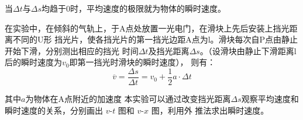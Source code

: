 \documentclass[UTF8]{article}
\theoremstyle{MyLineTheoremStyle} %
\theoremstyle{MyBlockTheoremStyle} %
\theoremstyle{MySubsubsectionStyle} %
\begin{document}
当$\Delta t$与$\Delta s$均趋于0时，平均速度的极限就为物体的瞬时速度。

在实验中，在倾斜的气轨上，于A点处放置一光电门，在滑块上先后安装上挡光距离不同的U形
挡光片，使各挡光片的第一挡光边距A点为l。滑块每次自P点由静止开始下滑，分别测出相应的挡光
时间$\Delta t$及挡光距离$\Delta s$。（设滑块由静止下滑距离l后的瞬时速度为$v_0$即第一挡光时滑块的瞬时速度），
则有：
\begin{equation}
    \overline v  = \frac{{\Delta s}}{{\Delta t}} = {v_0} + \frac{1}{2}a \cdot \Delta t
\end{equation}

其中$a$为物体在A点附近的加速度
本实验可以通过改变挡光距离$\Delta s$观察平均速度和瞬时速度的关系，分别画出 $v$-$t$ 图和 $v$-$x$ 图，利用外
推法求出瞬时速度。
\end{document}
